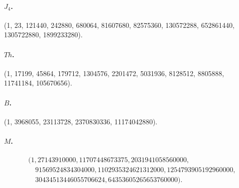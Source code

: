 \documentclass[11pt]{article}
\theoremstyle{definition}
\begin{document}
\paragraph{$J_4$.} (1, 23, 121440, 242880, 680064, 81607680, 82575360, 130572288, 652861440, 1305722880, 1899233280).
\paragraph{$Th$.} (1, 17199, 45864, 179712, 1304576, 2201472, 5031936, 8128512, 8805888, 11741184, 105670656).
\paragraph{$B$.} (1, 3968055, 23113728, 2370830336, 11174042880).
\paragraph{$M$.}
\[
\begin{aligned}
&(1,27143910000,11707448673375,2031941058560000,\\
&\quad91569524834304000,1102935324621312000,1254793905192960000,\\
&\quad30434513446055706624,64353605265653760000).
\end{aligned}
\]
\end{document}

